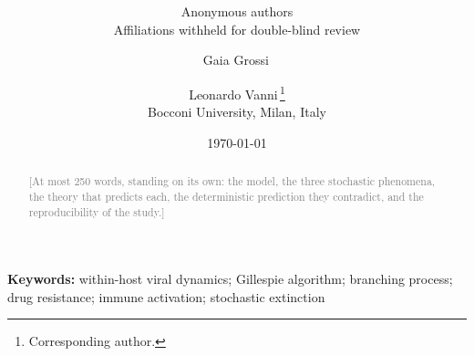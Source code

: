 \documentclass[10pt,twocolumn,letterpaper]{article}
\title{\bfseries\Large\papertitle}
\author{Anonymous authors \\ \normalsize Affiliations withheld for double-blind review}
\date{}
\title{\bfseries\Large\papertitle}
\author{Gaia Grossi\,\orcidlink{0009-0004-3192-1678} \and Leonardo Vanni\,\orcidlink{0009-0003-1869-9286}\thanks{Corresponding author. \note{email}} \\[2pt]
    \normalsize Bocconi University, Milan, Italy}
\date{\today}
\newcommand{\note}[1]{\textcolor{gray}{\small [#1]}}
\begin{document}
\maketitle

\begin{abstract}
\note{At most 250 words, standing on its own: the model, the three stochastic phenomena, the theory that predicts each, the deterministic prediction they contradict, and the reproducibility of the study.}
\end{abstract}

\noindent\textbf{Keywords:} within-host viral dynamics; Gillespie algorithm; branching process; drug resistance; immune activation; stochastic extinction








{\small

}

\appendix


\end{document}
